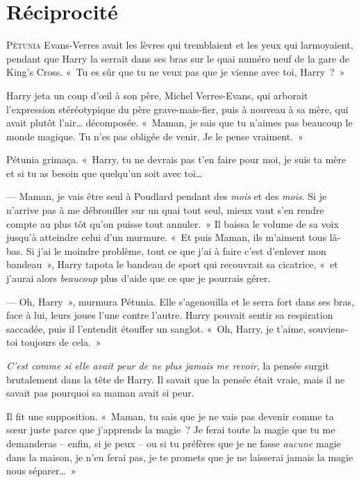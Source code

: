 
\chapter{Réciprocité}

\lettrine{P}{étunia} Evans-Verres avait les lèvres qui tremblaient et les yeux qui larmoyaient, pendant que Harry la serrait dans ses bras sur le quai numéro neuf de la gare de King's Cross.
«~Tu es sûr que tu ne veux pas que je vienne avec toi, Harry~?~»

Harry jeta un coup d'œil à son père, Michel Verres-Evans, qui arborait l'expression stéréotypique du père grave-mais-fier, puis à nouveau à sa mère, qui avait plutôt l'air… décomposée.
«~Maman, je sais que tu n'aimes pas beaucoup le monde magique. Tu n'es pas obligée de venir. Je le pense vraiment.~»

Pétunia grimaça.  «~Harry, tu ne devrais pas t'en faire pour moi, je suis ta mère et si tu as besoin que quelqu'un soit avec toi…

--- Maman, je vais être seul à Poudlard pendant des \emph{mois} et des \emph{mois}.  Si je n'arrive pas à me débrouiller sur un quai tout seul, mieux vaut s'en rendre compte au plus tôt qu'on puisse tout annuler.~» 
Il baissa le volume de sa voix jusqu'à atteindre celui d'un murmure. «~Et puis Maman, ils m'aiment tous là-bas.
Si j'ai le moindre problème, tout ce que j'ai à faire c'est d'enlever mon bandeau~», Harry tapota le bandeau de sport qui recouvrait sa cicatrice, «~et j'aurai alors \emph{beaucoup} plus d'aide que ce que je pourrais gérer.

--- Oh, Harry~», murmura Pétunia. Elle s'agenouilla et le serra fort dans ses bras, face à lui, leurs joues l'une contre l'autre.
Harry pouvait sentir sa respiration saccadée, puis il l'entendit étouffer un sanglot. «~Oh, Harry, je t'aime, souviens-toi toujours de cela.~»

\emph{C'est comme si elle avait peur de ne plus jamais me revoir}, la pensée surgit brutalement dans la tête de Harry.
Il savait que la pensée était vraie, mais il ne savait pas pourquoi sa maman avait si peur.

Il fit une supposition. «~Maman, tu sais que je ne vais pas devenir comme ta sœur juste parce que j'apprends la magie~?
Je ferai toute la magie que tu me demanderas -- enfin, si je peux -- ou si tu préfères que je ne fasse \emph{aucune} magie dans la maison, je n'en ferai pas, je te promets que je ne laisserai jamais la magie nous séparer…~»

